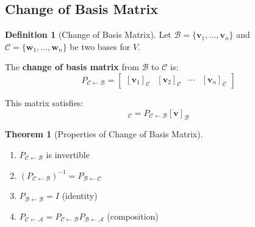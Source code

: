 \documentclass[12pt,a4paper]{article}
\theoremstyle{definition}
\newtheorem{definition}{Definition}[section]
\newtheorem{theorem}{Theorem}[section]
\begin{document}
\subsection{Change of Basis Matrix}

\begin{definition}[Change of Basis Matrix]
Let $\mathcal{B} = \{\mathbf{v}_1, \ldots, \mathbf{v}_n\}$ and $\mathcal{C} = \{\mathbf{w}_1, \ldots, \mathbf{w}_n\}$ be two bases for $V$.

The \textbf{change of basis matrix} from $\mathcal{B}$ to $\mathcal{C}$ is:
\begin{equation}
P_{\mathcal{C} \leftarrow \mathcal{B}} = \begin{bmatrix} [\mathbf{v}_1]_\mathcal{C} & [\mathbf{v}_2]_\mathcal{C} & \cdots & [\mathbf{v}_n]_\mathcal{C} \end{bmatrix}
\end{equation}

This matrix satisfies:
\begin{equation}
[\mathbf{v}]_\mathcal{C} = P_{\mathcal{C} \leftarrow \mathcal{B}} [\mathbf{v}]_\mathcal{B}
\end{equation}
\end{definition}

\begin{theorem}[Properties of Change of Basis Matrix]
\begin{enumerate}
    \item $P_{\mathcal{C} \leftarrow \mathcal{B}}$ is invertible
    
    \item $(P_{\mathcal{C} \leftarrow \mathcal{B}})^{-1} = P_{\mathcal{B} \leftarrow \mathcal{C}}$
    
    \item $P_{\mathcal{B} \leftarrow \mathcal{B}} = I$ (identity)
    
    \item $P_{\mathcal{C} \leftarrow \mathcal{A}} = P_{\mathcal{C} \leftarrow \mathcal{B}} P_{\mathcal{B} \leftarrow \mathcal{A}}$ (composition)
\end{enumerate}
\end{theorem}
\end{document}
